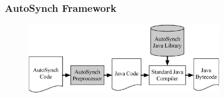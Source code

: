 \documentclass[mathserif,14pt,xcolor=table]{beamer}
\begin{document}



\begin{frame}[fragile]
    \frametitle{AutoSynch Framework}
    \begin{figure}[ht!]
        \centering
        \includegraphics[width=85mm]{fig/flow.eps}
        \label{fig:fw}
    \end{figure}
         
\end{frame}
\end{document}
